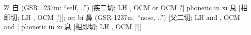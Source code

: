 %
%
%
%
   Zì 自 (GSR 1237m: ``self, ..'') [疾二切; LH {}, OCM {} or OCM {} ?] phonetic in xī 息 [相即切; LH {}, OCM {} [!]]; or: bí 鼻 (GSR 1237m: ``nose, ..'') [父二切; LH {} and {}, OCM {} and {}] phonetic in xī 息 [相即切; LH {}, OCM {} [!]]
